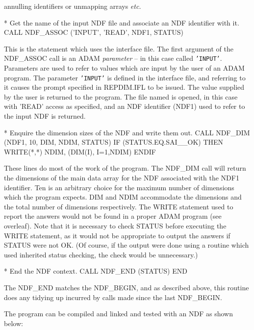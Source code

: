 \documentclass[twoside,11pt,nolof]{starlink}
\begin{document}
annulling identifiers or unmapping arrays \textit{etc.}
\begin{terminalv}
*   Get the name of the input NDF file and associate an NDF identifier with it.
      CALL NDF_ASSOC ('INPUT', 'READ', NDF1, STATUS)
\end{terminalv}
This is the statement which uses the interface file.
The first argument of the NDF\_ASSOC call is an ADAM {\sl parameter} --
in this case called \texttt{'INPUT'}.
Parameters are used to refer to values which are input by the user of an
ADAM program.
The parameter {\tt'INPUT'} is defined in the interface file, and referring to it
causes the prompt specified in REPDIM.IFL to be issued.
The value
supplied by the user is returned to the program.
The file named is opened, in this case with 'READ' access
as specified, and an NDF identifier (NDF1) used to refer to the input NDF
is returned.
\begin{terminalv}
*   Enquire the dimension sizes of the NDF and write them out.
      CALL NDF_DIM (NDF1, 10, DIM, NDIM, STATUS)
      IF (STATUS.EQ.SAI__OK) THEN
         WRITE(*,*) NDIM, (DIM(I), I=1,NDIM)
      ENDIF
\end{terminalv}
These lines do most of the work of the program.
The NDF\_DIM call will return the dimensions of the main data array
for the NDF associated with the NDF1 identifier.
Ten is an arbitrary choice  for the maximum number of dimensions
which the program expects.
DIM and NDIM accommodate the dimensions and the total number of dimensions
respectively.
The WRITE statement used to report the answers would not be found in
a proper ADAM program (see overleaf).
Note that it is necessary to check STATUS before executing the WRITE
statement, as it would not be appropriate to output the answers
if STATUS were not OK.
(Of course, if the output were done  using a routine which used
inherited status checking, the check would be unnecessary.)
\begin{terminalv}
*   End the NDF context.
      CALL NDF_END (STATUS)
      END
\end{terminalv}
The NDF\_END matches the NDF\_BEGIN,
and as described above, this routine does any tidying up incurred by
calls made since the last NDF\_BEGIN.

The program can be compiled and linked  and tested with
an NDF as shown below:
\end{document}
